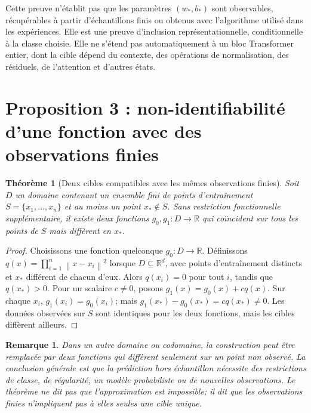 \documentclass[11pt,a4paper,oneside]{report}
\newtheorem{theorem}{Théorème}[chapter]
\newtheorem{remark}{Remarque}[chapter]
\newcommand{\R}{\mathbb R}
\newcommand{\norm}[1]{\left\lVert #1\right\rVert}
\begin{document}
Cette preuve n'établit pas que les paramètres \((w_*,b_*)\) sont observables, récupérables à partir d'échantillons finis ou obtenus avec l'algorithme utilisé dans les expériences. Elle est une preuve d'inclusion représentationnelle, conditionnelle à la classe choisie. Elle ne s'étend pas automatiquement à un bloc Transformer entier, dont la cible dépend du contexte, des opérations de normalisation, des résiduels, de l'attention et d'autres états.

\section{Proposition 3 : non-identifiabilité d'une fonction avec des observations finies}
\begin{theorem}[Deux cibles compatibles avec les mêmes observations finies]
Soit \(D\) un domaine contenant un ensemble fini de points d'entraînement \(S=\{x_1,\dots,x_n\}\) et au moins un point \(x_*\notin S\). Sans restriction fonctionnelle supplémentaire, il existe deux fonctions \(g_0,g_1:D\to\R\) qui coïncident sur tous les points de \(S\) mais diffèrent en \(x_*\).
\end{theorem}
\begin{proof}
Choisissons une fonction quelconque \(g_0:D\to\R\). Définissons \(q(x)=\prod_{i=1}^n\norm{x-x_i}^2\) lorsque \(D\subseteq\R^d\), avec points d'entraînement distincts et \(x_*\) différent de chacun d'eux. Alors \(q(x_i)=0\) pour tout \(i\), tandis que \(q(x_*)>0\). Pour un scalaire \(c\ne0\), posons \(g_1(x)=g_0(x)+c q(x)\). Sur chaque \(x_i\), \(g_1(x_i)=g_0(x_i)\); mais \(g_1(x_*)-g_0(x_*)=cq(x_*)\ne0\). Les données observées sur \(S\) sont identiques pour les deux fonctions, mais les cibles diffèrent ailleurs.\end{proof}
\begin{remark}
Dans un autre domaine ou codomaine, la construction peut être remplacée par deux fonctions qui diffèrent seulement sur un point non observé. La conclusion générale est que la prédiction hors échantillon nécessite des restrictions de classe, de régularité, un modèle probabiliste ou de nouvelles observations. Le théorème ne dit pas que l'approximation est impossible; il dit que les observations finies n'impliquent pas à elles seules une cible unique.
\end{remark}
\end{document}

